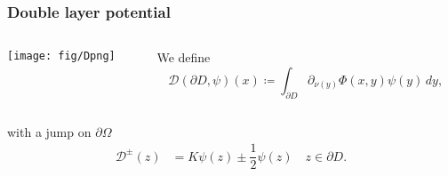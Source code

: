 \documentclass[10pt]{beamer}
\theoremstyle{plain}
\theoremstyle{plain}
\begin{document}
\begin{frame}
 \frametitle{Double layer potential}
\begin{columns}[T]
  \begin{column}{0.50\textwidth}
  \vspace{-0.2cm}
  \texttt{[image: fig/Dpng]}
  \end{column}
  \begin{column}{0.50\textwidth}
  \vspace{2cm}
   We define
   \begin{equation*}
    \mathcal{D}(\partial D,\psi)(x)\coloneqq \int_{\partial D} \partial_{\nu(y)}\Phi(x, y)\psi(y)\, dy,
    \label{eq:definition-double-layer}
   \end{equation*}
  \end{column}
 \end{columns}
 \vspace{0.1cm}
   with a jump on $\partial\Omega$
  \begin{align*}
   \mathcal{D}^\pm(z) &= K\psi(z) \pm\dfrac{1}{2}\psi(z)\quad z\in\partial D. \label{eq:double-pm-0}
  \end{align*}
 \end{frame}
\end{document}
